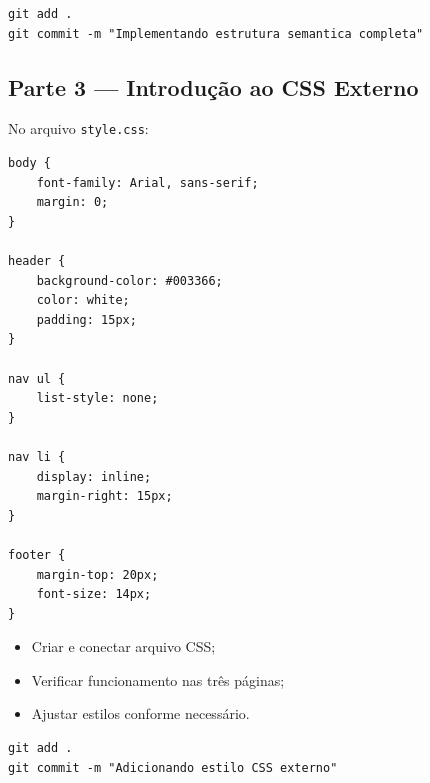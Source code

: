 \documentclass[12pt,a4paper]{article}
\begin{document}
\begin{boxAtividade}

\begin{boxCodigo}
\begin{verbatim}
git add .
git commit -m "Implementando estrutura semantica completa"
\end{verbatim}
\end{boxCodigo}

\end{boxAtividade}


\subsection{Parte 3 — Introdução ao CSS Externo}

No arquivo \texttt{style.css}:

\begin{boxCodigo}
\begin{verbatim}
body {
    font-family: Arial, sans-serif;
    margin: 0;
}

header {
    background-color: #003366;
    color: white;
    padding: 15px;
}

nav ul {
    list-style: none;
}

nav li {
    display: inline;
    margin-right: 15px;
}

footer {
    margin-top: 20px;
    font-size: 14px;
}
\end{verbatim}
\end{boxCodigo}

\begin{boxAtividade}

\begin{itemize}
\item Criar e conectar arquivo CSS;
\item Verificar funcionamento nas três páginas;
\item Ajustar estilos conforme necessário.
\end{itemize}

\end{boxAtividade}

\begin{boxAtividade}

\begin{boxCodigo}
\begin{verbatim}
git add .
git commit -m "Adicionando estilo CSS externo"
\end{verbatim}
\end{boxCodigo}

\end{boxAtividade}
\end{document}

